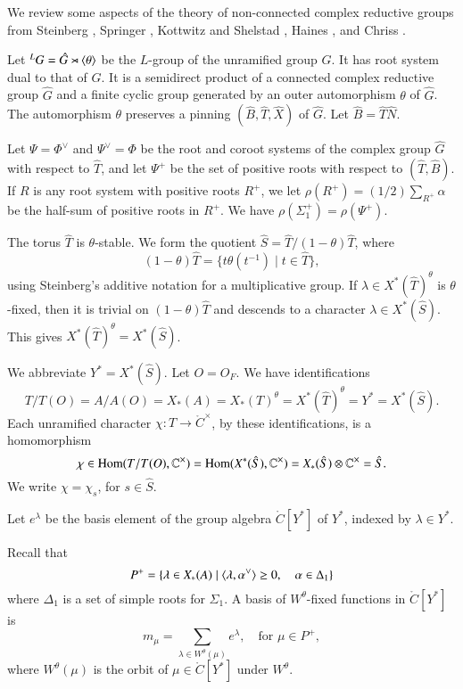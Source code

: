 We review some aspects of the theory of non-connected complex
reductive groups from Steinberg \cite{steinberg1968endomorphisms},
Springer \cite{springer2010linear}, Kottwitz and Shelstad
\cite{kottwitz1999foundations}, Haines \cite{haines2016dualities}, and
Chriss \cite{chriss}.

Let ${}^LG = \hat G \rtimes \langle{\theta}\rangle$ be the $L$-group of the
unramified group $G$.  It has root system dual to that of $G$.  It is
a semidirect product of a connected complex reductive group $\hat G$
and a finite cyclic group generated by an outer automorphism $\theta$
of $\hat G$.  The automorphism $\theta$ preserves a pinning $(\hat
B,\hat T,\hat X)$ of $\hat G$. Let $\hat B = \hat T\hat N$.

Let $\Psi=\Phi^\vee$ and $\Psi^\vee=\Phi$ be the root and coroot
systems of the complex group $\hat G$ with respect to $\hat T$, and
let $\Psi^+$ be the set of positive roots with respect to $(\hat
T,\hat B)$.  If $R$ is any root system with positive roots $R^+$, we
let $\rho(R^+) = (1/2)\sum_{R^+} \alpha$ be the half-sum of positive roots in $R^+$.  We have
$\rho(\Sigma^+_1) = \rho(\Psi^+)$.

The torus $\hat T$ is $\theta$-stable.  We form the quotient $\hat S =
\hat T/(1-\theta) \hat T$, where
\[
(1-\theta)\hat T = \{ t\theta(t^{-1}) \mid t\in \hat T\},
\]
using Steinberg's additive notation for a multiplicative group.  If $\lambda\in
X^*(\hat T)^\theta$ is $\theta$-fixed, then it is trivial on
$(1-\theta)\hat T$ and descends to a character $\lambda\in X^*(\hat
S)$.  This gives $X^*(\hat T)^\theta = X^*(\hat S)$.

We abbreviate $Y^* = X^*(\hat S)$. Let $O=O_F$.  We have
identifications
\begin{equation}\label{eqn:identify}
T/T(O)=A/A(O)=X_*(A)=X_*(T)^\theta  =X^*(\hat T)^\theta = Y^* = X^*(\hat S).
\end{equation}
Each unramified character $\chi:T\to \ring{C}^\times$, by these
identifications, is a homomorphism
\begin{equation}
\chi\in{\operatorname{Hom}}(T/T(O),\mathbb{C}^\times) = 
{\operatorname{Hom}}(X^*(\hat S),\mathbb{C}^\times) = 
X_*(\hat S)\otimes \mathbb{C}^\times = \hat S.
\end{equation}
We write $\chi = \chi_s$, for $s\in\hat S$.

Let $e^\lambda$ be the basis element of the group algebra
$\ring{C}[Y^*]$ of $Y^*$, indexed by $\lambda\in Y^*$.

Recall that
\[
P^+ = \{\lambda\in X_*(A) \mid \langle{\lambda,\alpha^\vee}\rangle\ge 0,
\quad \alpha\in \Delta_1\}
\]
where $\Delta_1$ is a set of simple roots for $\Sigma_1$.
A basis of $W^\theta$-fixed functions in $\ring{C}[Y^*]$ is
\[
m_\mu = \sum_{\lambda\in W^\theta(\mu)} e^\lambda, 
\quad \text{for }\mu\in P^+,
\]
where $W^\theta(\mu)$ is the orbit of $\mu\in\ring{C}[Y^*]$ under
$W^\theta$.

